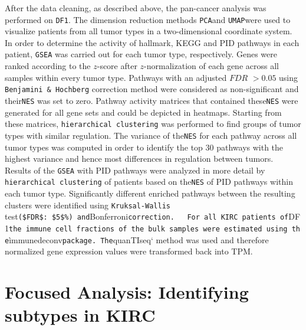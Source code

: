 \documentclass[
  parskip,
  oneside]{scrreprt}
\begin{document}
After the data cleaning, as described above, the pan-cancer analysis was
performed on \texttt{DF1}. The dimension reduction methods
\texttt{PCA}and \texttt{UMAP}were used to visualize patients from all
tumor types in a two-dimensional coordinate system. In order to
determine the activity of hallmark, KEGG and PID pathways in each
patient, \texttt{GSEA} was carried out for each tumor type,
respectively. Genes were ranked according to the \(z\)-score after
\(z\)-normalization of each gene across all samples within every tumor
type. Pathways with an adjusted \(FDR\) \(>0.05\) using
\texttt{Benjamini\ \&\ Hochberg} correction method were considered as
non-significant and their\texttt{NES} was set to zero. Pathway activity
matrices that contained these\texttt{NES} were generated for all gene
sets and could be depicted in heatmaps. Starting from these matrices,
\texttt{hierarchical\ clustering} was performed to find groups of tumor
types with similar regulation. The variance of the\texttt{NES} for each
pathway across all tumor types was computed in order to identify the top
30 pathways with the highest variance and hence most differences in
regulation between tumors. Results of the \texttt{GSEA} with PID
pathways were analyzed in more detail by
\texttt{hierarchical\ clustering} of patients based on the\texttt{NES}
of PID pathways within each tumor type. Significantly different enriched
pathways between the resulting clusters were identified using
\texttt{Kruksal-Wallis}
test\texttt{(\$FDR\$:\ \$5\$\%)\ and}Bonferroni\texttt{correction.\ \ \ For\ all\ KIRC\ patients\ of}DF1\texttt{the\ immune\ cell\ fractions\ of\ the\ bulk\ samples\ were\ estimated\ using\ the}ìmmunedeconv\texttt{package.\ The}quanTIseq`
method was used and therefore normalized gene expression values were
transformed back into TPM.

\hypertarget{focused-analysis-identifying-subtypes-in-kirc}{%
\section{Focused Analysis: Identifying subtypes in
KIRC}\label{focused-analysis-identifying-subtypes-in-kirc}}
\end{document}
